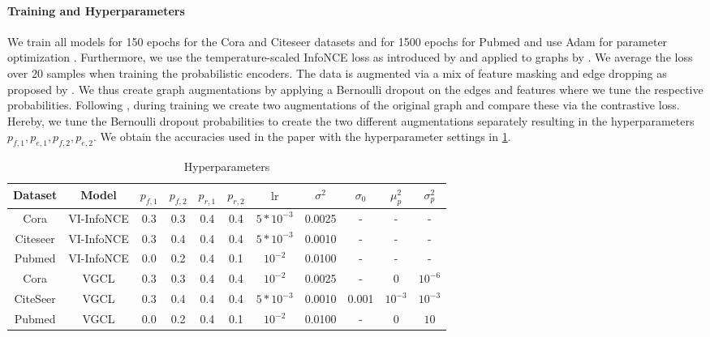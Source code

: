 \documentclass[tablecaption=bottom,wcp]{jmlr} %
\begin{document}
\paragraph{Training and Hyperparameters}
We train all models for 150 epochs for the Cora and Citeseer datasets and for 1500 epochs for Pubmed and use Adam for parameter optimization  \citep{kingma2014adam}. Furthermore, we use the temperature-scaled InfoNCE loss as introduced by \citet{SimCLR} and applied to graphs by \citet{GraphCL}. We average the loss over $20$ samples when training the probabilistic encoders. The data is augmented via a mix of feature masking and edge dropping as proposed by \citet{Grace}. We thus create graph augmentations by applying a Bernoulli dropout on the edges and features where we tune the respective probabilities. Following  \citet{liu2021}, during training we create two augmentations of the original graph and compare these via the contrastive loss. Hereby, we tune the Bernoulli dropout probabilities to create the two different augmentations separately resulting in the hyperparameters $p_{f,1},p_{e,1},p_{f,2},p_{e,2}$.  We obtain the accuracies used in the paper with the  hyperparameter settings in \cref{tab:hyp}.

\begin{table}
\centering
\begin{tabular}{ccccccccccc}
\hline Dataset& Model & $p_{f, 1}$ & $p_{f, 2}$ & $p_{r, 1}$ & $p_{r, 2}$ & $\begin{array}{c}\text { lr } \end{array}$  & $\sigma^2$ & $\sigma_{0}$ & $\mu_{p}^2$ & $\sigma_{p}^2$ \\
\hline Cora & VI-InfoNCE  & 0.3 & 0.3 & 0.4 & 0.4 & $5*10^{-3}$  & 0.0025 & - & - & - \\
Citeseer & VI-InfoNCE & 0.3 & 0.4 & 0.4 & 0.4 & $5*10^{-3}$  & 0.0010 & - & - & -\\
Pubmed & VI-InfoNCE  & 0.0 & 0.2 & 0.4 & 0.1 & $10^{-2}$  & 0.0100 & - & - & -\\
Cora & VGCL & 0.3 & 0.3 & 0.4 & 0.4 & $10^{-2}$  & 0.0025 & - & 0 & $10^{-6}$\\
CiteSeer & VGCL & 0.3 & 0.4 & 0.4 & 0.4 & $5*10^{-3}$  & 0.0010 & 0.001 & $10^{-3}$ & $10^{-3}$\\
Pubmed & VGCL & 0.0 & 0.2 & 0.4 & 0.1 & $10^{-2}$  & 0.0100 & - & 0 &  $10$\\
\hline
\end{tabular}
\caption{Hyperparameters}
\label{tab:hyp}
\end{table}
\end{document}
